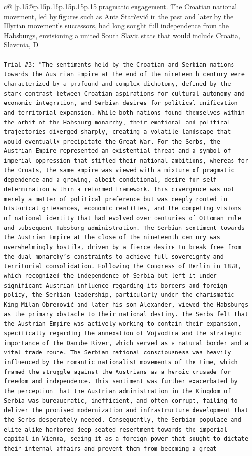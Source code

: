 \documentclass{article}
\begin{document}
{\begin{supertabular}{c@{$\;$}|p{.15\linewidth}@{}p{.15\linewidth}p{.15\linewidth}p{.15\linewidth}p{.15\linewidth}p{.15\linewidth}}
{{{pragmatic engagement. The Croatian national movement, led by figures such as Ante Starčević in the past and later by the Illyrian movement's successors, had long sought full independence from the Habsburgs, envisioning a united South Slavic state that would include Croatia, Slavonia, D} \\
\\ 
\texttt{Trial \#3: "The sentiments held by the Croatian and Serbian nations towards the Austrian Empire at the end of the nineteenth century were characterized by a profound and complex dichotomy, defined by the stark contrast between Croatian aspirations for cultural autonomy and economic integration, and Serbian desires for political unification and territorial expansion. While both nations found themselves within the orbit of the Habsburg monarchy, their emotional and political trajectories diverged sharply, creating a volatile landscape that would eventually precipitate the Great War. For the Serbs, the Austrian Empire represented an existential threat and a symbol of imperial oppression that stifled their national ambitions, whereas for the Croats, the same empire was viewed with a mixture of pragmatic dependence and a growing, albeit conditional, desire for self{-}determination within a reformed framework. This divergence was not merely a matter of political preference but was deeply rooted in historical grievances, economic realities, and the competing visions of national identity that had evolved over centuries of Ottoman rule and subsequent Habsburg administration. The Serbian sentiment towards the Austrian Empire at the close of the nineteenth century was overwhelmingly hostile, driven by a fierce desire to break free from the dual monarchy's constraints to achieve full sovereignty and territorial consolidation. Following the Congress of Berlin in 1878, which recognized the independence of Serbia but left it under significant Austrian influence regarding its borders and foreign policy, the Serbian leadership, particularly under the charismatic King Milan Obrenović and later his son Alexander, viewed the Habsburgs as the primary obstacle to their national destiny. The Serbs felt that the Austrian Empire was actively working to contain their expansion, specifically regarding the annexation of Vojvodina and the strategic importance of the Danube River, which served as a natural border and a vital trade route. The Serbian national consciousness was heavily influenced by the romantic nationalist movements of the time, which framed the struggle against the Austrians as a heroic crusade for freedom and independence. This sentiment was further exacerbated by the perception that the Austrian administration in the Kingdom of Serbia was bureaucratic, inefficient, and often corrupt, failing to deliver the promised modernization and infrastructure development that the Serbs desperately needed. Consequently, the Serbian populace and elite alike harbored deep{-}seated resentment towards the imperial capital in Vienna, seeing it as a foreign power that sought to dictate their internal affairs and prevent them from becoming a great }}}
\end{supertabular}}
\end{document}
